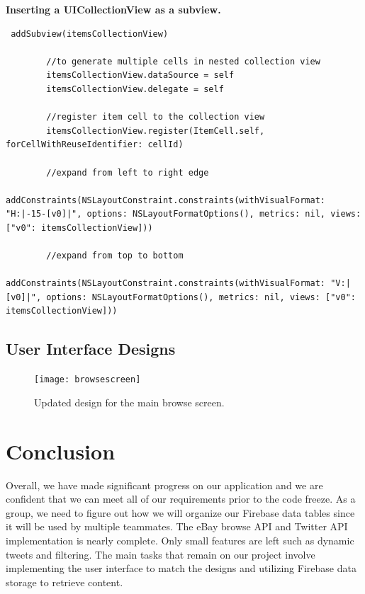 \documentclass[onecolumn, draftclsnofoot,10pt, compsoc]{IEEEtran}
\begin{document}
\noindent\textbf{Inserting a UICollectionView as a subview.}
\begin{lstlisting}
 addSubview(itemsCollectionView)
        
        //to generate multiple cells in nested collection view
        itemsCollectionView.dataSource = self
        itemsCollectionView.delegate = self
        
        //register item cell to the collection view
        itemsCollectionView.register(ItemCell.self, forCellWithReuseIdentifier: cellId)
        
        //expand from left to right edge
        addConstraints(NSLayoutConstraint.constraints(withVisualFormat: "H:|-15-[v0]|", options: NSLayoutFormatOptions(), metrics: nil, views: ["v0": itemsCollectionView]))
        
        //expand from top to bottom
        addConstraints(NSLayoutConstraint.constraints(withVisualFormat: "V:|[v0]|", options: NSLayoutFormatOptions(), metrics: nil, views: ["v0": itemsCollectionView]))
\end{lstlisting}


\subsection{User Interface Designs}
\begin{figure}[H]
\centering
\captionsetup{justification=centering}
\texttt{[image: browsescreen]}
\caption{Updated design for the main browse screen.}
\end{figure}

\section{Conclusion}
Overall, we have made significant progress on our application and we are confident that we can meet all of our requirements prior to the code freeze. As a group, we need to figure out how we will organize our Firebase data tables since it will be used by multiple teammates. The eBay browse API and Twitter API implementation is nearly complete. Only small features are left such as dynamic tweets and filtering. The main tasks that remain on our project involve implementing the user interface to match the designs and utilizing Firebase data storage to retrieve content.  
\end{document}
